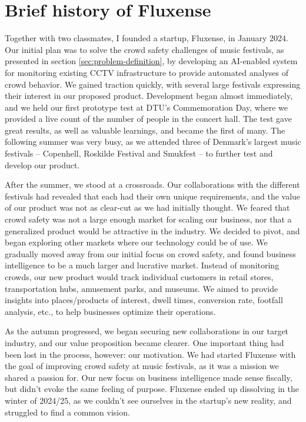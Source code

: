 \section{Brief history of Fluxense}

Together with two classmates, I founded a startup, Fluxense, in January 2024. Our initial plan was to solve the crowd safety challenges of music festivals, as presented in section \ref{sec:problem-definition}, by developing an AI-enabled system for monitoring existing CCTV infrastructure to provide automated analyses of crowd behavior. We gained traction quickly, with several large festivals expressing their interest in our proposed product. Development began almost immediately, and we held our first prototype test at DTU's Commemoration Day, where we provided a live count of the number of people in the concert hall. The test gave great results, as well as valuable learnings, and became the first of many. The following summer was very busy, as we attended three of Denmark's largest music festivals -- Copenhell, Roskilde Festival and Smukfest -- to further test and develop our product.

After the summer, we stood at a crossroads. Our collaborations with the different festivals had revealed that each had their own unique requirements, and the value of our product was not as clear-cut as we had initially thought. We feared that crowd safety was not a large enough market for scaling our business, nor that a generalized product would be attractive in the industry. We decided to pivot, and began exploring other markets where our technology could be of use. We gradually moved away from our initial focus on crowd safety, and found business intelligence to be a much larger and lucrative market. Instead of monitoring crowds, our new product would track individual customers in retail stores, transportation hubs, amusement parks, and museums. We aimed to provide insights into places/products of interest, dwell times, conversion rate, footfall analysis, etc., to help businesses optimize their operations.

As the autumn progressed, we began securing new collaborations in our target industry, and our value proposition became clearer. One important thing had been lost in the process, however: our motivation. We had started Fluxense with the goal of improving crowd safety at music festivals, as it was a mission we shared a passion for. Our new focus on business intelligence made sense fiscally, but didn't evoke the same feeling of purpose. Fluxense ended up dissolving in the winter of 2024/25, as we couldn't see ourselves in the startup's new reality, and struggled to find a common vision.

